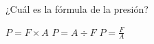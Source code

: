 
\question ¿Cuál es la fórmula de la presión?

  \begin{oneparchoices}
    \choice $ P = F \times A $
    \choice $ P = A \div F $
    \CorrectChoice $ P = \frac{F}{A} $
  \end{oneparchoices}
